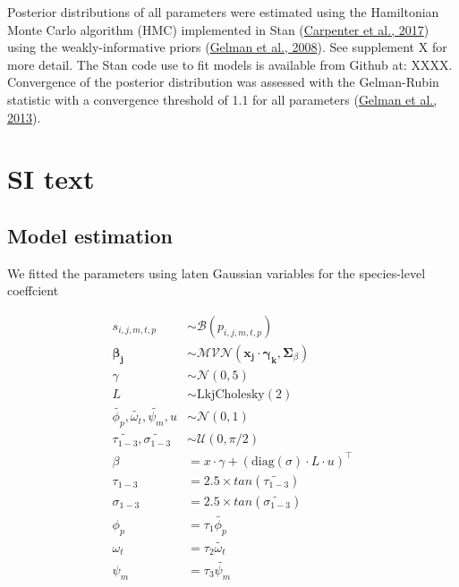 \documentclass[
  12pt,
  a4paper,
,tablecaptionabove
]{scrartcl}
\begin{document}
Posterior distributions of all parameters were estimated using the
Hamiltonian Monte Carlo algorithm (HMC) implemented in Stan
(\protect\hyperlink{ref-Carpenter2017}{Carpenter et al., 2017}) using
the weakly-informative priors (\protect\hyperlink{ref-Gelman2008}{Gelman
et al., 2008}). See supplement X for more detail. The Stan code use to
fit models is available from Github at: XXXX. Convergence of the
posterior distribution was assessed with the Gelman-Rubin statistic with
a convergence threshold of 1.1 for all parameters
(\protect\hyperlink{ref-Gelman2013}{Gelman et al., 2013}).

\hypertarget{si-text}{%
\section{SI text}\label{si-text}}

\hypertarget{model-estimation}{%
\subsection{Model estimation}\label{model-estimation}}

We fitted the parameters using laten Gaussian variables for the
species-level coeffcient

\begin{align}
s_{i,j,m,t,p} &\sim \mathcal{B}(p_{i, j, m, t, p}) \\
\boldsymbol{\beta_j} &\sim \mathcal{MVN}(\boldsymbol{x_j} \cdot \boldsymbol{\gamma_k}, {\boldsymbol \Sigma_{\beta}})  \\
\gamma &\sim \mathcal{N}(0, 5) \\
L &\sim \mathrm{LkjCholesky}(2) \\
\tilde{\phi_p}, \tilde{\omega_t}, \tilde{\psi_m}, u &\sim \mathcal{N}(0, 1) \\
\tilde{\tau_{1-3}}, \tilde{\sigma_{1-3}} &\sim \mathcal{U}(0, \pi/2) \\
\beta &= x \cdot \gamma + (\mathrm{diag}(\sigma)\cdot L \cdot u)^\top \\
\tau_{1-3} &= 2.5 \times tan(\tilde{\tau_{1-3}}) \\
\sigma_{1-3} &= 2.5 \times tan(\tilde{\sigma_{1-3}}) \\
\phi_p &= \tau_1 \tilde{\phi_p} \\
\omega_t &= \tau_2 \tilde{\omega_t} \\
\psi_m &= \tau_3 \tilde{\psi_m} \\
\end{align}
\end{document}
